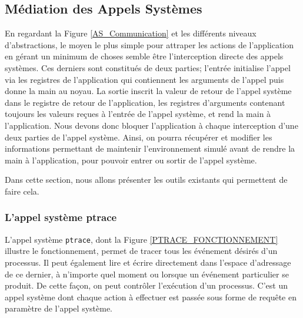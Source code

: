 \subsection{Médiation des Appels Systèmes}

En regardant la Figure \ref{AS_Communication} et les différents niveaux
d'abstractions, le moyen le plus simple pour attraper les actions de
l'application en gérant un minimum de choses semble être l'interception directe des appels systèmes. Ces derniers sont constitués de deux parties; l'entrée
initialise l'appel via les registres de l'application qui contiennent les
arguments de l'appel puis donne la main au noyau. La sortie inscrit la valeur de
retour de l'appel système dans le registre de retour de l'application, les
registres d'arguments contenant toujours les valeurs reçues à l'entrée de
l'appel système, et rend la main à l'application. Nous devons donc bloquer
l'application à chaque interception d'une deux parties de l'appel système. Ainsi, on pourra récupérer et modifier les informations permettant de maintenir
l'environnement simulé avant de rendre la main à l'application, pour pouvoir entrer ou
sortir de l'appel système.

 Dans cette section, nous allons présenter les outils existants qui permettent
 de faire cela.
 
 \subsubsection{L'appel système ptrace}
 \label{subsection:ptrace}
               
L'appel système \texttt{ptrace}\citep{AS:Interception, MARION:Interception},
dont la Figure \ref{PTRACE_FONCTIONNEMENT} illustre le fonctionnement, permet de
tracer tous les événement désirés d'un processus. Il peut également lire et
écrire directement dans l'espace d'adressage de ce dernier, à n'importe quel
moment ou lorsque un événement particulier se produit. De cette façon, on peut
contrôler l'exécution d'un processus. C'est un appel système dont chaque action
à effectuer est passée sous forme de requête en paramètre de l'appel système.

